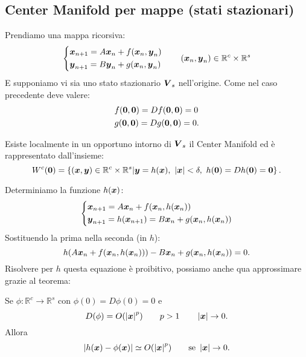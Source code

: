\subsection{Center Manifold per mappe (stati stazionari)}%
Prendiamo una mappa ricorsiva:
\[
\begin{dcases}
    \boldsymbol{x}_{n+1}=A\boldsymbol{x}_n + f(\boldsymbol{x}_n, \boldsymbol{y}_n) \\
    \boldsymbol{y}_{n+1}=B\boldsymbol{y}_n + g(\boldsymbol{x}_n, \boldsymbol{y}_n) 
\end{dcases}
\qquad  (\boldsymbol{x}_n, \boldsymbol{y}_n) \in \mathbb{R}^c \times \mathbb{R}^s
\]
E supponiamo vi sia uno stato stazionario $\boldsymbol{V}_s$ nell'origine. Come nel caso precedente deve valere:
\[\begin{aligned}
    &f(\boldsymbol{0}, \boldsymbol{0}) = Df(\boldsymbol{0},\boldsymbol{0}) = 0 \\
    &g(\boldsymbol{0}, \boldsymbol{0}) = Dg(\boldsymbol{0},\boldsymbol{0}) = 0 
.\end{aligned}\]
\begin{thm}[Di esistenza]
    Esiste localmente in un opportuno intorno di $\boldsymbol{V}_s$ il Center Manifold ed è rappresentato dall'insieme:
    \[
	W^c(\boldsymbol{0}) = 
	\left\{(\boldsymbol{x}, \boldsymbol{y}) \in \mathbb{R}^c \times \mathbb{R}^s| \boldsymbol{y}=h(\boldsymbol{x}), \ \left|\boldsymbol{x}\right|<\delta, \ h(\boldsymbol{0}) = Dh(\boldsymbol{0}) = \boldsymbol{0}\right\}
    .\] 
\end{thm}
\noindent
Determiniamo la funzione $h(\boldsymbol{x})$:
\[
\begin{dcases}
    \boldsymbol{x}_{n+1}= A\boldsymbol{x}_n + f(\boldsymbol{x}_n, h(\boldsymbol{x}_n) ) \\
    \boldsymbol{y}_{n+1}= h(\boldsymbol{x}_{n+1}) =B\boldsymbol{x}_n + g(\boldsymbol{x}_n, h(\boldsymbol{x}_n) ) \\
\end{dcases}
\]
Sostituendo la prima nella seconda (in $h$):
\[
h(A\boldsymbol{x}_n + f(\boldsymbol{x}_n, h(\boldsymbol{x}_n) )) - B\boldsymbol{x}_n + g(\boldsymbol{x}_n, h(\boldsymbol{x}_n) ) = 0
.\] 
Risolvere per $h$ questa equazione è proibitivo, possiamo anche qua approssimare grazie al teorema:
\begin{thm}[]
    Se $\phi :\mathbb{R}^c\to \mathbb{R}^s$ con $\phi (0) = D\phi(0)=0 $ e 
    \[
	D(\phi) = O(\left|\boldsymbol{x}\right|^p) \qquad  p>1 \qquad  \left| \boldsymbol{x}\right|\to 0
    .\] 
    Allora 
    \[
	\left|h(\boldsymbol{x}) - \phi (\boldsymbol{x}) \right|\simeq O(\left|\boldsymbol{x}\right|^p) \qquad  \text{se }\left|\boldsymbol{x}\right|\to 0
    .\] 
\end{thm}
\noindent
